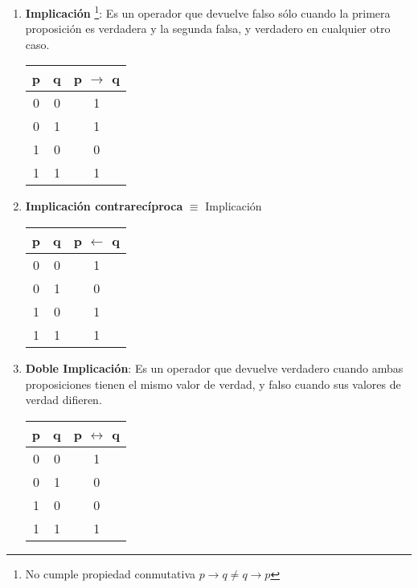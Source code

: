 \documentclass[a4paper, twoside]{article}
\begin{document}
\begin{enumerate}
	\item \textbf{Implicación} \footnote{No cumple propiedad conmutativa 
	$p \to q \neq q \to p$}: Es un operador que devuelve falso sólo cuando la 
	primera proposición es verdadera y la segunda falsa, y verdadero en 
	cualquier otro caso.
		\begin{center}
			\begin{tabular}{|c|c|c|}
			\hline
			\textbf{p} & \textbf{q} & \textbf{p} $\to$ \textbf{q}\\
			\cline{0 - 1}
			\hline
			0 & 0 & 1\\
			0 & 1 & 1\\
			1 & 0 & 0\\
			1 & 1 & 1\\
			\hline
			\end{tabular}
		\end{center}

	\item \textbf{Implicación contrarecíproca} $\equiv$ Implicación
		\begin{center}
			\begin{tabular}{|c|c|c|}
			\hline
			\textbf{p} & \textbf{q} & \textbf{p} $\leftarrow$ \textbf{q}\\
			\cline{0 - 1}
			\hline
			0 & 0 & 1\\
			0 & 1 & 0\\
			1 & 0 & 1\\
			1 & 1 & 1\\
			\hline
			\end{tabular}
		\end{center}

	\item \textbf{Doble Implicación}: Es un operador que devuelve verdadero 
	cuando ambas proposiciones tienen el mismo valor de verdad, y falso cuando 
	sus valores de verdad difieren.
		\begin{center}
			\begin{tabular}{|c|c|c|}
			\hline
			\textbf{p} & \textbf{q} & \textbf{p} $\leftrightarrow$ \textbf{q}\\
			\cline{0 - 1}
			\hline
			0 & 0 & 1\\
			0 & 1 & 0\\
			1 & 0 & 0\\
			1 & 1 & 1\\
			\hline
			\end{tabular}
		\end{center}
\end{enumerate}
\end{document}
